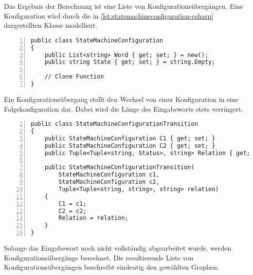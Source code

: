 Das Ergebnis der Berechnung ist eine Liste von Konfigurationsübergängen. Eine Konfiguration wird durch die in \cref{lst:statemachineconfiguration-csharp} dargestellten Klasse modelliert.

\begin{lstlisting}[language={[Sharp]C}, breaklines=true, tabsize=2, showstringspaces=false, frame=single, numbers=left, basicstyle=\small,label = {lst:statemachineconfiguration-csharp}, caption={Modellierung einer StateMachineConfiguration in C\#}, captionpos=b] 
public class StateMachineConfiguration
{
	public List<string> Word { get; set; } = new();
	public string State { get; set; } = string.Empty;
	
	// Clone Function
}
\end{lstlisting}

Ein Konfigurationsübergang stellt den Wechsel von einer Konfiguration in eine Folgekonfiguration dar. Dabei wird die Länge des Eingabeworts stets verringert.

\begin{lstlisting}[language={[Sharp]C}, breaklines=true, tabsize=2, showstringspaces=false, frame=single, numbers=left, basicstyle=\small,label = {lst:statemachineconfigurationtransition-csharp}, caption={Modellierung einer StateMachineConfigurationTransition in C\#}, captionpos=b] 
public class StateMachineConfigurationTransition
{
	public StateMachineConfiguration C1 { get; set; }
	public StateMachineConfiguration C2 { get; set; }
	public Tuple<Tuple<string, Status>, string> Relation { get; set; }
	
	public StateMachineConfigurationTransition(
		StateMachineConfiguration c1, 
		StateMachineConfiguration c2, 
		Tuple<Tuple<string, string>, string> relation)
	{
		C1 = c1;
		C2 = c2;
		Relation = relation;
	}
}
\end{lstlisting}

Solange das Eingabewort noch nicht vollständig abgearbeitet wurde, werden Konfigurationsübergänge berechnet. Die resultierende Liste von Konfigurationsübergängen beschreibt eindeutig den gewählten Graphen. 

